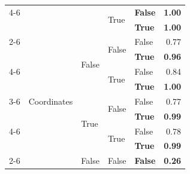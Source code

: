 \documentclass{article}
\begin{document}
\begin{table}
\begin{center}
{\begin{tabular}{@{}lllllr@{}}
    \cmidrule{4-6}
                                                                        &                                 &                           & \multirow[c]{2}{*}{True}  & \textbf{False}        & \textbf{1.00} \\
                                                                        &                                 &                           &                           & \textbf{True}         & \textbf{1.00} \\
    \cmidrule{2-6}
                                                                        & \multirow[c]{9}{*}{Coordinates} & \multirow[c]{4}{*}{False} & \multirow[c]{2}{*}{False} & False                 & 0.77 \\
                                                                        &                                 &                           &                           & \textbf{True}         & \textbf{0.96} \\
    \cmidrule{4-6}
                                                                        &                                 &                           & \multirow[c]{2}{*}{True}  & False                 & 0.84 \\
                                                                        &                                 &                           &                           & \textbf{True}         & \textbf{1.00} \\
    \cmidrule{3-6}
                                                                        &                                 & \multirow[c]{4}{*}{True}  & \multirow[c]{2}{*}{False} & False                 & 0.77 \\
                                                                        &                                 &                           &                           & \textbf{True}         & \textbf{0.99} \\
    \cmidrule{4-6}
                                                                        &                                 &                           & \multirow[c]{2}{*}{True}  & False                 & 0.78 \\
                                                                        &                                 &                           &                           & \textbf{True}         & \textbf{0.99} \\
    \cmidrule{2-6}
                                                                        & \multirow[c]{9}{*}{RGB}         & \multirow[c]{4}{*}{False} & \multirow[c]{2}{*}{False} & \textbf{False}        & \textbf{0.26} \\

\end{tabular}}
\end{center}
\end{table}
\end{document}
